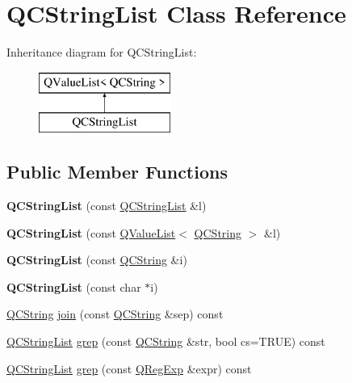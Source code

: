 \hypertarget{class_q_c_string_list}{}\section{Q\+C\+String\+List Class Reference}
\label{class_q_c_string_list}
Inheritance diagram for Q\+C\+String\+List\+:\begin{figure}[H]
\begin{center}
\leavevmode
\includegraphics[height=2.000000cm]{class_q_c_string_list}
\end{center}
\end{figure}
\subsection*{Public Member Functions}
\begin{DoxyCompactItemize}
\item 
\mbox{\label{class_q_c_string_list_a15afcf8287228ff8a35ce459da3893cd}} 
{\bfseries Q\+C\+String\+List} (const \mbox{\hyperlink{class_q_c_string_list}{Q\+C\+String\+List}} \&l)
\item 
\mbox{\label{class_q_c_string_list_ac5089d928065f465fa8d08e65f409d22}} 
{\bfseries Q\+C\+String\+List} (const \mbox{\hyperlink{class_q_value_list}{Q\+Value\+List}}$<$ \mbox{\hyperlink{class_q_c_string}{Q\+C\+String}} $>$ \&l)
\item 
\mbox{\label{class_q_c_string_list_a4302c96bbf39de90455fddcf7dc6189b}} 
{\bfseries Q\+C\+String\+List} (const \mbox{\hyperlink{class_q_c_string}{Q\+C\+String}} \&i)
\item 
\mbox{\label{class_q_c_string_list_ae1cb608543d6dcdbfba4ede1cfcc93e8}} 
{\bfseries Q\+C\+String\+List} (const char $\ast$i)
\item 
\mbox{\hyperlink{class_q_c_string}{Q\+C\+String}} \mbox{\hyperlink{class_q_c_string_list_a6f889e803df00f762cbc6ce37bd9b5c0}{join}} (const \mbox{\hyperlink{class_q_c_string}{Q\+C\+String}} \&sep) const
\item 
\mbox{\hyperlink{class_q_c_string_list}{Q\+C\+String\+List}} \mbox{\hyperlink{class_q_c_string_list_ae8a239f0870315d5e9b02cf6bddd2237}{grep}} (const \mbox{\hyperlink{class_q_c_string}{Q\+C\+String}} \&str, bool cs=T\+R\+UE) const
\item 
\mbox{\hyperlink{class_q_c_string_list}{Q\+C\+String\+List}} \mbox{\hyperlink{class_q_c_string_list_aab758c04ef18aed9dad4f93226d9760c}{grep}} (const \mbox{\hyperlink{class_q_reg_exp}{Q\+Reg\+Exp}} \&expr) const
\end{DoxyCompactItemize}
